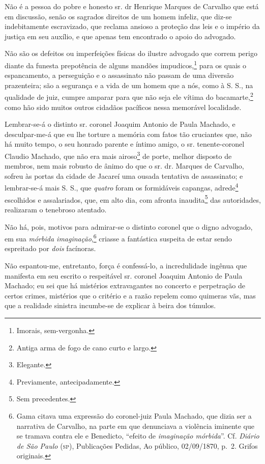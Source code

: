 Não é a pessoa do pobre e honesto sr. dr Henrique Marques de Carvalho
que está em discussão, senão os sagrados direitos de um homem infeliz,
que diz-se indebitamente escravizado, que reclama ansioso a proteção das
leis e o império da justiça em seu auxílio, e que apenas tem encontrado
o apoio do advogado.

Não são os defeitos ou imperfeições físicas do ilustre advogado que
correm perigo diante da funesta prepotência de alguns mandões
impudicos,\footnote{ Imorais, sem-vergonha.} para os quais o
espancamento, a perseguição e o assassinato não passam de uma diversão
prazenteira; são a segurança e a vida de um homem que a nós, como à S.
S., na qualidade de juiz, cumpre amparar para que não seja ele vítima do
bacamarte,\footnote{ Antiga arma de fogo de cano curto e largo.} como
hão sido muitos outros cidadãos pacíficos nessa memorável localidade.

Lembrar-se-á o distinto sr. coronel Joaquim Antonio de Paula Machado, e
desculpar-me-á que eu lhe torture a memória com fatos tão cruciantes
que, não há muito tempo, o seu honrado parente e íntimo amigo, o sr.
tenente-coronel Claudio Machado, que não era mais airoso\footnote{
  Elegante.} de porte, melhor disposto de membros, nem mais robusto de
ânimo do que o sr. dr. Marques de Carvalho, sofreu às portas da cidade
de Jacareí uma ousada tentativa de assassinato; e lembrar-se-á mais S.
S., que \emph{quatro} foram os formidáveis capangas, adrede\footnote{
  Previamente, antecipadamente.} escolhidos e assalariados, que, em alto
dia, com afronta inaudita\footnote{ Sem precedentes.} das autoridades,
realizaram o tenebroso atentado.

Não há, pois, motivos para admirar-se o distinto coronel que o digno
advogado, em sua \emph{mórbida imaginação},\footnote{ Gama citava uma
  expressão do coronel-juiz Paula Machado, que dizia ser a narrativa de
  Carvalho, na parte em que denunciava a violência iminente que se
  tramava contra ele e Benedicto, ``efeito de \emph{imaginação mórbida}''.
  Cf. \emph{Diário de São Paulo} (\textsc{sp}), Publicações Pedidas, Ao público,
  02/09/1870, p.~2. Grifos originais.} criasse a fantástica suspeita de
estar sendo espreitado por \emph{dois} facínoras.

Não espantou-me, entretanto, força é confessá-lo, a incredulidade
ingênua que manifesta em seu escrito o respeitável sr. coronel Joaquim
Antonio de Paula Machado; eu sei que há mistérios extravagantes no
concerto e perpetração de certos crimes, mistérios que o critério e a
razão repelem como quimeras vãs, mas que a realidade sinistra incumbe-se
de explicar à beira dos túmulos.

